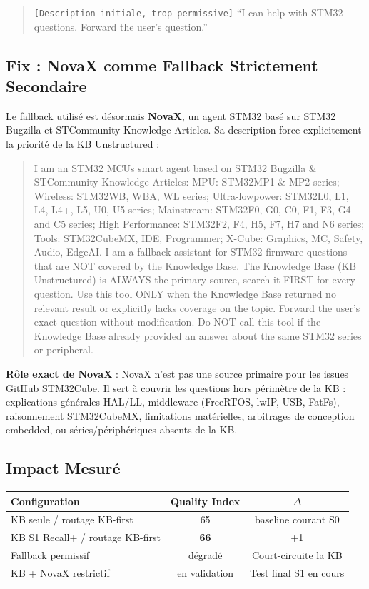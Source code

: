 \begin{quote}
\small\texttt{[Description initiale, trop permissive]} ``I can help with STM32 questions. Forward the user's question.''
\end{quote}

\subsection{Fix : NovaX comme Fallback Strictement Secondaire}

Le fallback utilisé est désormais \textbf{NovaX}, un agent STM32 basé sur STM32 Bugzilla et STCommunity Knowledge Articles. Sa description force explicitement la priorité de la KB Unstructured :

\begin{quote}
\small I am an STM32 MCUs smart agent based on STM32 Bugzilla \& STCommunity Knowledge Articles: MPU: STM32MP1 \& MP2 series; Wireless: STM32WB, WBA, WL series; Ultra-lowpower: STM32L0, L1, L4, L4+, L5, U0, U5 series; Mainstream: STM32F0, G0, C0, F1, F3, G4 and C5 series; High Performance: STM32F2, F4, H5, F7, H7 and N6 series; Tools: STM32CubeMX, IDE, Programmer; X-Cube: Graphics, MC, Safety, Audio, EdgeAI. I am a fallback assistant for STM32 firmware questions that are NOT covered by the Knowledge Base. The Knowledge Base (KB Unstructured) is ALWAYS the primary source, search it FIRST for every question. Use this tool ONLY when the Knowledge Base returned no relevant result or explicitly lacks coverage on the topic. Forward the user's exact question without modification. Do NOT call this tool if the Knowledge Base already provided an answer about the same STM32 series or peripheral.
\end{quote}

\textbf{Rôle exact de NovaX} : NovaX n'est pas une source primaire pour les issues GitHub STM32Cube. Il sert à couvrir les questions hors périmètre de la KB : explications générales HAL/LL, middleware (FreeRTOS, lwIP, USB, FatFs), raisonnement STM32CubeMX, limitations matérielles, arbitrages de conception embedded, ou séries/périphériques absents de la KB.

\subsection{Impact Mesuré}

\begin{longtable}{lcc}
\toprule
\textbf{Configuration} & \textbf{Quality Index} & \textbf{$\Delta$} \\
\midrule
KB seule / routage KB-first & 65 & baseline courant S0 \\
KB S1 Recall+ / routage KB-first & \textbf{66} & +1 \\
Fallback permissif & dégradé & Court-circuite la KB \\
KB + NovaX restrictif & en validation & Test final S1 en cours \\
\bottomrule
\end{longtable}

